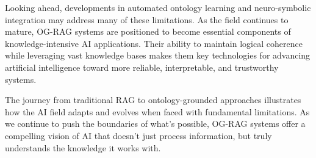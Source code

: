 Looking ahead, developments in automated ontology learning and neuro-symbolic integration may address many of these limitations. As the field continues to mature, OG-RAG systems are positioned to become essential components of knowledge-intensive AI applications. Their ability to maintain logical coherence while leveraging vast knowledge bases makes them key technologies for advancing artificial intelligence toward more reliable, interpretable, and trustworthy systems.

The journey from traditional RAG to ontology-grounded approaches illustrates how the AI field adapts and evolves when faced with fundamental limitations. As we continue to push the boundaries of what's possible, OG-RAG systems offer a compelling vision of AI that doesn't just process information, but truly understands the knowledge it works with.

\printbibliography
